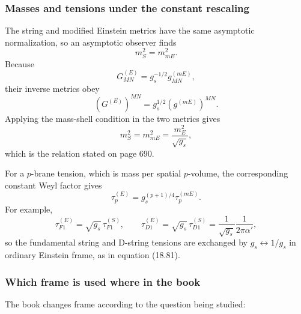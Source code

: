 \documentclass[
  10pt,
  a4paper,
  openany]{book}
\begin{document}
\subsubsection{Masses and tensions under the constant
rescaling}\label{masses-and-tensions-under-the-constant-rescaling}

The string and modified Einstein metrics have the same asymptotic
normalization, so an asymptotic observer finds \[
m_S^2=m_{mE}^2.
\] Because \[
G^{(E)}_{MN}=g_s^{-1/2}g^{(mE)}_{MN},
\] their inverse metrics obey \[
(G^{(E)})^{MN}=g_s^{1/2}(g^{(mE)})^{MN}.
\] Applying the mass-shell condition in the two metrics gives \[
\boxed{
m_S^2=m_{mE}^2=\frac{m_E^2}{\sqrt{g_s}}
},
\] which is the relation stated on page 690.

For a \(p\)-brane tension, which is mass per spatial \(p\)-volume, the
corresponding constant Weyl factor gives \[
\tau_p^{(E)}
=g_s^{(p+1)/4}\tau_p^{(mE)}.
\] For example, \[
\tau_{F1}^{(E)}=\sqrt{g_s}\,\tau_{F1}^{(S)},
\qquad
\tau_{D1}^{(E)}=\sqrt{g_s}\,\tau_{D1}^{(S)}
=\frac1{\sqrt{g_s}}\frac1{2\pi\alpha'},
\] so the fundamental string and D-string tensions are exchanged by
\(g_s\leftrightarrow1/g_s\) in ordinary Einstein frame, as in equation
(18.81).

\subsubsection{Which frame is used where in the
book}\label{which-frame-is-used-where-in-the-book}

The book changes frame according to the question being studied:
\end{document}
